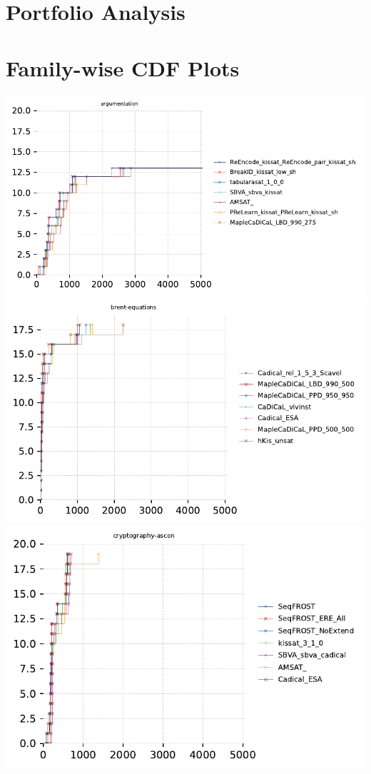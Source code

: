 \documentclass{article}
\begin{document}
\section{Portfolio Analysis}



\section{Family-wise CDF Plots}

\includegraphics[width=\linewidth]{gen/sc2023/cdfs/cdf-argumentation.pdf}
\includegraphics[width=\linewidth]{gen/sc2023/cdfs/cdf-brent-equations.pdf}
\includegraphics[width=\linewidth]{gen/sc2023/cdfs/cdf-cryptography-ascon.pdf}
\end{document}
